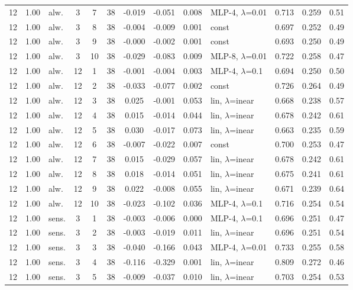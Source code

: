 \documentclass[10pt]{article}
\begin{document}
\begin{scriptsize}
\begin{longtable}{cclcc c ccc l ccc}
12 & 1.00 & alw. & 3 & 7 & 38 & -0.019 & -0.051 & 0.008 & MLP-4, $\lambda$=0.01 & 0.713 & 0.259 & 0.51 \\
12 & 1.00 & alw. & 3 & 8 & 38 & -0.004 & -0.009 & 0.001 & const & 0.697 & 0.252 & 0.49 \\
12 & 1.00 & alw. & 3 & 9 & 38 & -0.000 & -0.002 & 0.001 & const & 0.693 & 0.250 & 0.49 \\
12 & 1.00 & alw. & 3 & 10 & 38 & -0.029 & -0.083 & 0.009 & MLP-8, $\lambda$=0.01 & 0.722 & 0.258 & 0.47 \\
12 & 1.00 & alw. & 12 & 1 & 38 & -0.001 & -0.004 & 0.003 & MLP-4, $\lambda$=0.1 & 0.694 & 0.250 & 0.50 \\
12 & 1.00 & alw. & 12 & 2 & 38 & -0.033 & -0.077 & 0.002 & const & 0.726 & 0.264 & 0.49 \\
12 & 1.00 & alw. & 12 & 3 & 38 & 0.025 & -0.001 & 0.053 & lin, $\lambda$=inear & 0.668 & 0.238 & 0.57 \\
12 & 1.00 & alw. & 12 & 4 & 38 & 0.015 & -0.014 & 0.044 & lin, $\lambda$=inear & 0.678 & 0.242 & 0.61 \\
12 & 1.00 & alw. & 12 & 5 & 38 & 0.030 & -0.017 & 0.073 & lin, $\lambda$=inear & 0.663 & 0.235 & 0.59 \\
12 & 1.00 & alw. & 12 & 6 & 38 & -0.007 & -0.022 & 0.007 & const & 0.700 & 0.253 & 0.47 \\
12 & 1.00 & alw. & 12 & 7 & 38 & 0.015 & -0.029 & 0.057 & lin, $\lambda$=inear & 0.678 & 0.242 & 0.61 \\
12 & 1.00 & alw. & 12 & 8 & 38 & 0.018 & -0.014 & 0.051 & lin, $\lambda$=inear & 0.675 & 0.241 & 0.61 \\
12 & 1.00 & alw. & 12 & 9 & 38 & 0.022 & -0.008 & 0.055 & lin, $\lambda$=inear & 0.671 & 0.239 & 0.64 \\
12 & 1.00 & alw. & 12 & 10 & 38 & -0.023 & -0.102 & 0.036 & MLP-4, $\lambda$=0.1 & 0.716 & 0.254 & 0.54 \\
12 & 1.00 & sens. & 3 & 1 & 38 & -0.003 & -0.006 & 0.000 & MLP-4, $\lambda$=0.1 & 0.696 & 0.251 & 0.47 \\
12 & 1.00 & sens. & 3 & 2 & 38 & -0.003 & -0.019 & 0.011 & lin, $\lambda$=inear & 0.696 & 0.251 & 0.54 \\
12 & 1.00 & sens. & 3 & 3 & 38 & -0.040 & -0.166 & 0.043 & MLP-4, $\lambda$=0.01 & 0.733 & 0.255 & 0.58 \\
12 & 1.00 & sens. & 3 & 4 & 38 & -0.116 & -0.329 & 0.001 & lin, $\lambda$=inear & 0.809 & 0.272 & 0.46 \\
12 & 1.00 & sens. & 3 & 5 & 38 & -0.009 & -0.037 & 0.010 & lin, $\lambda$=inear & 0.703 & 0.254 & 0.53 \\

\end{longtable}
\end{scriptsize}
\end{document}
